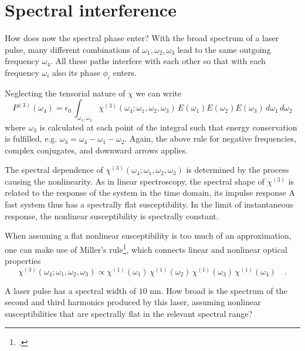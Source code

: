 \section{Spectral interference}

How does now the spectral phase enter? With the broad spectrum of  a laser pulse, many different combinations of $\omega_1, \omega_2, \omega_3$ lead to the same outgoing frequency $\omega_4$. All these paths interfere with each other so that with each frequency $\omega_i$ also its phase $\phi_i$ enters.

Neglecting the tensorial nature of $\chi$ we can write
\begin{equation}
  P^{(3)}(\omega_4) = \epsilon_0 \, 
    \int_{\omega_1, \omega_2} \chi^{(3)}(\omega_4; \omega_1, \omega_2, \omega_3) \,  E(\omega_1) E(\omega_2) E(\omega_3) \, d\omega_1 \, d\omega_2  
\end{equation}	
where $\omega_3$ is calculated at each point of the integral such that energy conservation is fulfilled, e.g. $\omega_3 = \omega_4 - \omega_1 - \omega_2$. Again, the above rule for negative frequencies, complex conjugates, and downward arrows applies.

The spectral dependence of $\chi^{(3)}(\omega_4; \omega_1, \omega_2, \omega_3)$ is determined by the process causing the nonlinearity. As in linear spectroscopy, the spectral shape of $\chi^{(3)}$ is related to the response of the system in the time domain, its impulse response A fast system thus has a spectrally flat susceptibility. In the limit of instantaneous response, the nonlinear susceptibility is spectrally constant.
		
When assuming a flat nonlinear susceptibility is too much of an approximation, one can make use of Miller's rule\footcite{Boyd2008,Miller64,Obermeier18}, which connects linear and nonlinear optical properties
\begin{equation}
  \chi^{(3)}(\omega_4; \omega_1, \omega_2, \omega_3) \propto  \chi^{(1)}(\omega_1) \,   \chi^{(1)}(\omega_2)  \,   \chi^{(1)}(\omega_3)  \,   \chi^{(1)}(\omega_4)  \quad .
 \end{equation}
 		
\begin{questions}
\item A laser pulse has a spectral width of $10$ nm. How broad is the spectrum of the second and third harmonics produced by this laser, assuming nonlinear susceptibilities that are spectrally flat in the relevant spectral range?
\end{questions}
 
\printbibliography[segment=\therefsegment,heading=subbibliography]


